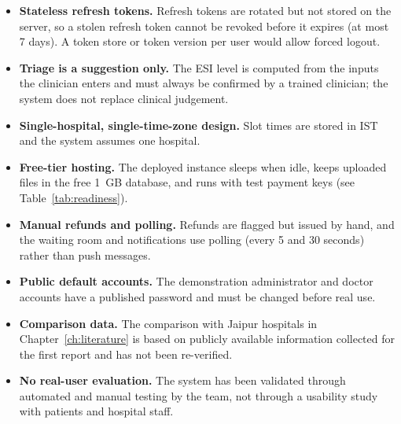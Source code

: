 \begin{itemize}
    \item \textbf{Stateless refresh tokens.} Refresh tokens are rotated but not stored on the server, so a stolen refresh token cannot be revoked before it expires (at most 7 days). A token store or token version per user would allow forced logout.
    \item \textbf{Triage is a suggestion only.} The ESI level is computed from the inputs the clinician enters and must always be confirmed by a trained clinician; the system does not replace clinical judgement.
    \item \textbf{Single-hospital, single-time-zone design.} Slot times are stored in IST and the system assumes one hospital.
    \item \textbf{Free-tier hosting.} The deployed instance sleeps when idle, keeps uploaded files in the free 1~GB database, and runs with test payment keys (see Table~\ref{tab:readiness}).
    \item \textbf{Manual refunds and polling.} Refunds are flagged but issued by hand, and the waiting room and notifications use polling (every 5 and 30 seconds) rather than push messages.
    \item \textbf{Public default accounts.} The demonstration administrator and doctor accounts have a published password and must be changed before real use.
    \item \textbf{Comparison data.} The comparison with Jaipur hospitals in Chapter~\ref{ch:literature} is based on publicly available information collected for the first report and has not been re-verified.
    \item \textbf{No real-user evaluation.} The system has been validated through automated and manual testing by the team, not through a usability study with patients and hospital staff.
\end{itemize}
